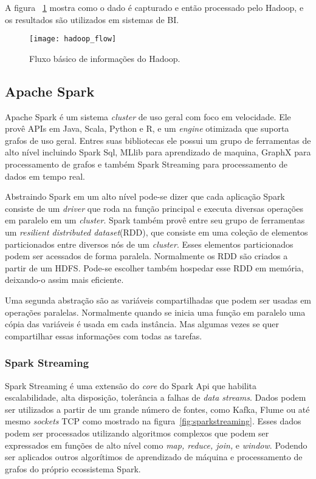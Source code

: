 A figura ~\ref{fig:hadoopflow} mostra como o dado é capturado e então processado pelo Hadoop, e os resultados são utilizados em sistemas de BI.~\cite{hadoopessentials}

\begin{figure}[!h]
	\caption{\label{fig:hadoopflow} Fluxo básico de informações do Hadoop.}
	\begin{center}
		\texttt{[image: hadoop\_flow]}
	\end{center}
\end{figure}


\subsection{Apache Spark}
Apache Spark é um sistema \textit{cluster} de uso geral com foco em velocidade. Ele provê APIs em Java, Scala, Python e R, e um \textit{engine} otimizada que suporta grafos de uso geral. Entres suas bibliotecas ele possui um grupo de ferramentas de alto nível incluindo Spark Sql, MLlib para aprendizado de maquina, GraphX para processamento de grafos e também Spark Streaming para processamento de dados em tempo real.

Abstraindo Spark em um alto nível pode-se dizer que cada aplicação Spark consiste de um \textit{driver} que roda na função principal e executa diversas operações em paralelo em um \textit{cluster}. Spark também provê entre seu grupo de  ferramentas um \textit{resilient distributed dataset}(RDD), que consiste em uma coleção de elementos particionados entre diversos nós de um \textit{cluster}. Esses elementos particionados podem ser acessados de forma paralela. Normalmente os RDD são criados a partir de um HDFS. Pode-se escolher também hospedar esse RDD em memória, deixando-o assim mais eficiente.

Uma segunda abstração são as variáveis compartilhadas que podem ser usadas em operações paralelas. Normalmente quando se inicia uma função em paralelo uma cópia das variáveis é usada em cada instância. Mas algumas vezes se quer compartilhar essas informações com todas as tarefas.

\subsubsection{Spark Streaming}
Spark Streaming é uma extensão do \textit{core} do Spark Api que habilita escalabilidade, alta disposição, tolerância a falhas de \textit{data streams}. Dados podem ser utilizados a partir de um grande número de fontes, como Kafka, Flume ou até mesmo \textit{sockets} TCP como mostrado na figura~\ref{fig:sparkstreaming}. Esses dados podem ser processados utilizando algoritmos complexos que podem ser expressados em funções de alto nível como \textit{map, reduce, join,} e \textit{window}. Podendo ser aplicados outros algorítimos de aprendizado de máquina e processamento de grafos do próprio ecossistema Spark.~\cite{sparkstreaming}

